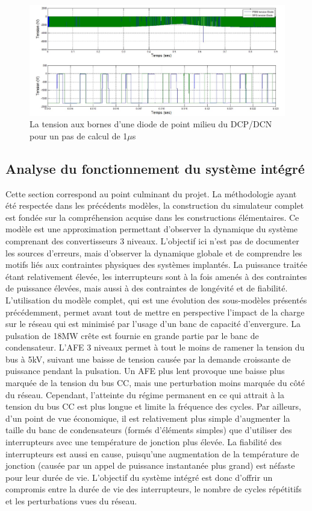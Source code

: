 \begin{figure}[htb]
\centering
\includegraphics[scale=0.5]{fig/DCP_AFE/1u/hash_diode.jpg}
\caption{La tension aux bornes d'une diode de point milieu du DCP/DCN pour un pas de calcul de 1$\mu$s}
\label{AF_DC_HV1}
\end{figure}


\subsection{Analyse du fonctionnement du système intégré}
Cette section correspond au point culminant du projet. La méthodologie ayant été respectée dans les précédents modèles, la construction du simulateur complet est fondée sur la compréhension acquise dans les constructions élémentaires. Ce modèle est une approximation permettant d'observer la dynamique du système comprenant des convertisseurs 3 niveaux. L'objectif ici n'est pas de documenter les sources d'erreurs, mais d'observer la dynamique globale et de comprendre les motifs liés aux contraintes physiques des systèmes implantés. La puissance traitée étant relativement élevée, les interrupteurs sont à la fois amenés à des contraintes de puissance élevées, mais aussi à des contraintes de longévité et de fiabilité. L'utilisation du modèle complet, qui est une évolution des sous-modèles présentés précédemment, permet avant tout de mettre en perspective l'impact de la charge sur le réseau qui est minimisé par l'usage d'un banc de capacité d'envergure. La pulsation de 18MW crête est fournie en grande partie par le banc de condensateur. L'AFE 3 niveaux permet à tout le moins de ramener la tension du bus à 5kV, suivant une baisse de tension causée par la demande croissante de puissance pendant la pulsation. Un AFE plus lent provoque une baisse plus marquée de la tension du bus CC, mais une perturbation moins marquée du côté du réseau. Cependant, l'atteinte du régime permanent en ce qui attrait à la tension du bus CC est plus longue et limite la fréquence des cycles. Par ailleurs, d'un point de vue économique, il est relativement plus simple d'augmenter la taille du banc de condensateurs (formés d'éléments simples) que d'utiliser des interrupteurs avec une température de jonction plus élevée. La fiabilité des interrupteurs est aussi en cause, puisqu'une augmentation de la température de jonction (causée par un appel de puissance instantanée plus grand) est néfaste pour leur durée de vie. L'objectif du système intégré est donc d'offrir un compromis entre la durée de vie des interrupteurs, le nombre de cycles répétitifs et les perturbations vues du réseau.
